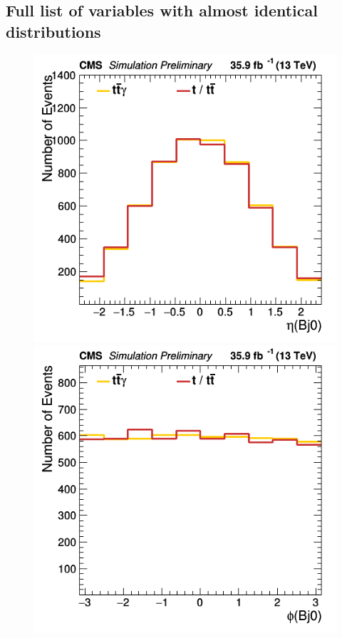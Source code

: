 \documentclass[11pt]{scrartcl}
\begin{document}
	\subsection{Full list of variables with almost identical distributions}
	\label{sec:annex-identical}
	\begin{figure}[H]
	\centering
	\begin{minipage}{.5\textwidth}
	  \centering
	  \includegraphics[width=0.7\linewidth]{figures/Notused/Bj0_eta.png}
	\end{minipage}%
	\begin{minipage}{.5\textwidth}
	  \centering
	  \includegraphics[width=0.7\linewidth]{figures/Notused/Bj0_phi.png}
	\end{minipage}
	\end{figure}
	
\end{document}
